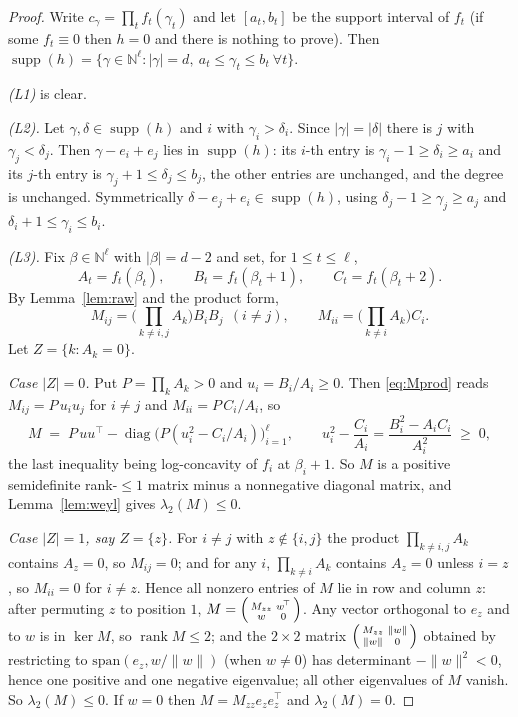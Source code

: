 \documentclass[11pt]{article}
\theoremstyle{definition}
\DeclareMathOperator{\supp}{supp}
\newcommand{\N}{\mathbb{N}}
\begin{document}
\begin{proof}
Write $c_\gamma=\prod_t f_t(\gamma_t)$ and let $[a_t,b_t]$ be the support interval of $f_t$
(if some $f_t\equiv0$ then $h=0$ and there is nothing to prove). Then
$\supp(h)=\{\gamma\in\N^\ell: |\gamma|=d,\ a_t\le\gamma_t\le b_t\ \forall t\}$.

\emph{(L1)} is clear.

\emph{(L2).} Let $\gamma,\delta\in\supp(h)$ and $i$ with $\gamma_i>\delta_i$. Since
$|\gamma|=|\delta|$ there is $j$ with $\gamma_j<\delta_j$. Then
$\gamma-e_i+e_j$ lies in $\supp(h)$: its $i$-th entry is $\gamma_i-1\ge\delta_i\ge a_i$ and its
$j$-th entry is $\gamma_j+1\le\delta_j\le b_j$, the other entries are unchanged, and the degree
is unchanged. Symmetrically $\delta-e_j+e_i\in\supp(h)$, using
$\delta_j-1\ge\gamma_j\ge a_j$ and $\delta_i+1\le\gamma_i\le b_i$.

\emph{(L3).} Fix $\beta\in\N^\ell$ with $|\beta|=d-2$ and set, for $1\le t\le\ell$,
\[
  A_t=f_t(\beta_t),\qquad B_t=f_t(\beta_t+1),\qquad C_t=f_t(\beta_t+2).
\]
By Lemma~\ref{lem:raw} and the product form,
\begin{equation}\label{eq:Mprod}
  M_{ij}=\Big(\prod_{k\ne i,j}A_k\Big)B_iB_j\ \ (i\ne j),
  \qquad
  M_{ii}=\Big(\prod_{k\ne i}A_k\Big)C_i .
\end{equation}
Let $Z=\{k:A_k=0\}$.

\emph{Case $|Z|=0$.} Put $P=\prod_kA_k>0$ and $u_i=B_i/A_i\ge0$. Then \eqref{eq:Mprod} reads
$M_{ij}=P\,u_iu_j$ for $i\ne j$ and $M_{ii}=P\,C_i/A_i$, so
\[
  M \;=\; P\,uu^{\!\top}-\operatorname{diag}\!\big(P(u_i^2-C_i/A_i)\big)_{i=1}^{\ell},
  \qquad
  u_i^2-\frac{C_i}{A_i}=\frac{B_i^2-A_iC_i}{A_i^2}\;\ge\;0 ,
\]
the last inequality being log-concavity of $f_i$ at $\beta_i+1$. So $M$ is a positive
semidefinite rank-$\le1$ matrix minus a nonnegative diagonal matrix, and
Lemma~\ref{lem:weyl} gives $\lambda_2(M)\le0$.

\emph{Case $|Z|=1$, say $Z=\{z\}$.} For $i\ne j$ with $z\notin\{i,j\}$ the product
$\prod_{k\ne i,j}A_k$ contains $A_z=0$, so $M_{ij}=0$; and for any $i$, $\prod_{k\ne i}A_k$
contains $A_z=0$ unless $i=z$, so $M_{ii}=0$ for $i\ne z$. Hence all nonzero entries of $M$
lie in row and column $z$: after permuting $z$ to position $1$,
$M=\begin{psmallmatrix}M_{zz}&w^{\!\top}\\ w&0\end{psmallmatrix}$. Any vector orthogonal to
$e_z$ and to $w$ is in $\ker M$, so $\operatorname{rank}M\le2$; and the $2\times2$ matrix
$\begin{psmallmatrix}M_{zz}&\|w\|\\ \|w\|&0\end{psmallmatrix}$ obtained by restricting to
$\mathrm{span}(e_z,w/\|w\|)$ (when $w\ne0$) has determinant $-\|w\|^2<0$, hence one positive
and one negative eigenvalue; all other eigenvalues of $M$ vanish. So $\lambda_2(M)\le0$. If
$w=0$ then $M=M_{zz}e_ze_z^{\!\top}$ and $\lambda_2(M)=0$.


\end{proof}
\end{document}

